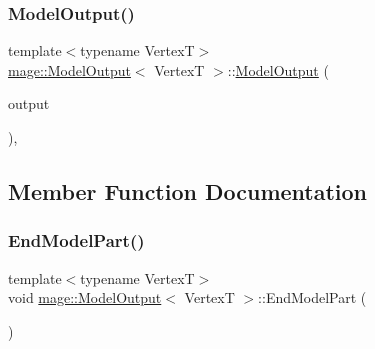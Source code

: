 \hypertarget{structmage_1_1_model_output_aac808e40a66f33da4ea28ebb7443623d}{}\label{structmage_1_1_model_output_aac808e40a66f33da4ea28ebb7443623d} 
\subsubsection{\texorpdfstring{Model\+Output()}{ModelOutput()}\hspace{0.1cm}{\footnotesize\ttfamily [2/2]}}
{\footnotesize\ttfamily template$<$typename VertexT$>$ \\
\hyperlink{structmage_1_1_model_output}{mage\+::\+Model\+Output}$<$ VertexT $>$\+::\hyperlink{structmage_1_1_model_output}{Model\+Output} (\begin{DoxyParamCaption}\item[{const \hyperlink{structmage_1_1_model_output}{Model\+Output}$<$ VertexT $>$ \&}]{output }\end{DoxyParamCaption})\hspace{0.3cm}{\ttfamily [private]}, {\ttfamily [delete]}}



\subsection{Member Function Documentation}
\hypertarget{structmage_1_1_model_output_a5df0c4240b1fac61ac0cdbf9766bb98d}{}\label{structmage_1_1_model_output_a5df0c4240b1fac61ac0cdbf9766bb98d} 
\subsubsection{\texorpdfstring{End\+Model\+Part()}{EndModelPart()}}
{\footnotesize\ttfamily template$<$typename VertexT$>$ \\
void \hyperlink{structmage_1_1_model_output}{mage\+::\+Model\+Output}$<$ VertexT $>$\+::End\+Model\+Part (\begin{DoxyParamCaption}{ }\end{DoxyParamCaption})}

\hypertarget{structmage_1_1_model_output_a23ce6e3b252227781c173149b76e73ee}{}\label{structmage_1_1_model_output_a23ce6e3b252227781c173149b76e73ee} 
